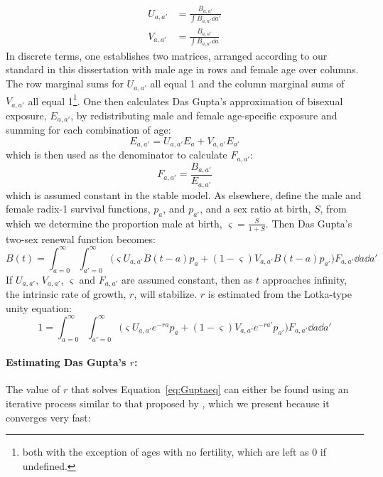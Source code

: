 \begin{align}
U_{a,a'} &= \frac{B_{a,a'}}{\int B_{a,a'} \dd a'}\\
V_{a,a'} &= \frac{B_{a,a'}}{\int B_{a,a'} \dd a}
\end{align}
In discrete terms, one establishes two matrices, arranged according to our
standard in this dissertation with male age in rows and female age over columns.
The row marginal sums for $U_{a,a'}$ all equal 1 and the column marginal sums of
$V_{a,a'}$ all equal 1\footnote{both with the exception of ages with no
fertility, which are left as 0 if undefined.}. One then calculates Das Gupta's
approximation of bisexual exposure, $E_{a,a'}$, by redistributing male and
female age-specific exposure and summing for each combination of age:
\begin{equation}
E_{a,a'} = U_{a,a'}E_a + V_{a,a'}E_{a'}
\end{equation}
which is then used as the denominator to calculate $F_{a,a'}$:
\begin{equation}
F_{a,a'} = \frac{B_{a,a'}}{E_{a,a'}}
\end{equation}
which is assumed constant in the stable model. As elsewhere, define the
male and female radix-1 survival functions, $p_a$, and $p_{a'}$, and a sex ratio
at birth, $S$, from which we determine the proportion male at
birth, $\varsigma=\frac{S}{1+S}$. Then Das Gupta's two-sex renewal
function becomes:
\begin{equation}
B(t) = \int_{a=0}^\infty \int_{a'=0}^\infty \Big( \varsigma U_{a,a'} B(t-a) p_a
+ (1-\varsigma)V_{a,a'}B(t-a) p_{a'}\Big)F_{a,a'} \dd a \dd a'
\end{equation}
If $U_{a,a'}$, $V_{a,a'}$, $\varsigma$ and $F_{a,a'}$ are assumed constant, then
as $t$ approaches infinity, the intrinsic rate of growth, $r$, will stabilize.
$r$ is estimated from the Lotka-type unity equation:
\begin{equation}
\label{eq:Guptaeq}
1 = \int_{a=0}^\infty \int_{a'=0}^\infty \Big( \varsigma U_{a,a'} e^{-ra} p_a
+ (1-\varsigma)V_{a,a'}e^{-ra'} p_{a'}\Big)F_{a,a'} \dd a \dd a'
\end{equation}
\paragraph{Estimating Das Gupta's $r$: } The value of $r$ that solves
Equation~\eqref{eq:Guptaeq} can either be found using an iterative 
process similar to that proposed by \citet{coale1957new}, which we present
because it converges very fast:

